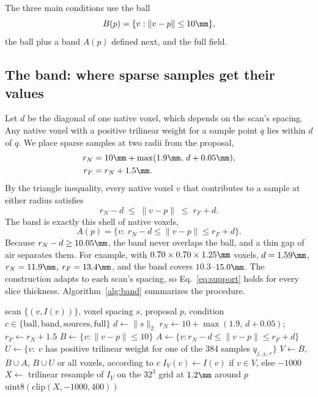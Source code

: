 The three main conditions use the ball
\begin{equation}
B(p)=\{v:\lVert v-p\rVert\le 10\mm\},
\end{equation}
the ball plus a band $A(p)$ defined next, and the full field.

\subsection{The band: where sparse samples get their values}
\label{sec:band}

Let $d$ be the diagonal of one native voxel, which depends on the scan's spacing. Any native voxel with a positive trilinear weight for a sample point $q$ lies within $d$ of $q$. We place sparse samples at two radii from the proposal,
\begin{equation}
 \begin{aligned}
 r_N &=10\mm+\max(1.9\mm,\,d+0.05\mm),\\
 r_F &=r_N+1.5\mm .
 \end{aligned}
 \label{eq:radii}
\end{equation}
By the triangle inequality, every native voxel $v$ that contributes to a sample at either radius satisfies
\begin{equation}
 r_N-d\;\leq\;\lVert v-p\rVert\;\leq\;r_F+d .
 \label{eq:support}
\end{equation}
The band is exactly this shell of native voxels,
\begin{equation}
A(p)=\{v:\ r_N-d\le\lVert v-p\rVert\le r_F+d\}.
\label{eq:band}
\end{equation}
Because $r_N-d\ge10.05\mm$, the band never overlaps the ball, and a thin gap of air separates them. For example, with $0.70\times0.70\times1.25\mm$ voxels, $d=1.59\mm$, $r_N=11.9\mm$, $r_F=13.4\mm$, and the band covers $10.3$--$15.0\mm$. The construction adapts to each scan's spacing, so Eq.~\eqref{eq:support} holds for every slice thickness. Algorithm~\ref{alg:band} summarizes the procedure.

\begin{algorithm}[t]
\caption{Building one visibility-controlled input}
\label{alg:band}
\small
\begin{algorithmic}[1]
\Require scan $\{(v,I(v))\}$, voxel spacing $s$, proposal $p$, condition $c\in\{\text{ball},\text{band},\text{sources},\text{full}\}$
\State $d\gets\lVert s\rVert_2$ 
\State $r_N\gets 10+\max(1.9,\,d+0.05)$;\ \ $r_F\gets r_N+1.5$ 
\State $B\gets\{v:\lVert v-p\rVert\le10\}$
\State $A\gets\{v:r_N-d\le\lVert v-p\rVert\le r_F+d\}$ 
\State $U\gets\{v:\ v$ has positive trilinear weight for one of the 384 samples $q_{j,\pm,r}\}$
\State $V\gets B$, $B\cup A$, $B\cup U$ or all voxels, according to $c$
\State $I_V(v)\gets I(v)$ if $v\in V$, else $-1000$ 
\State $X\gets$ trilinear resample of $I_V$ on the $32^3$ grid at $1.2\mm$ around $p$
\State \Return $\mathrm{uint8}(\mathrm{clip}(X,-1000,400))$
\end{algorithmic}
\end{algorithm}

